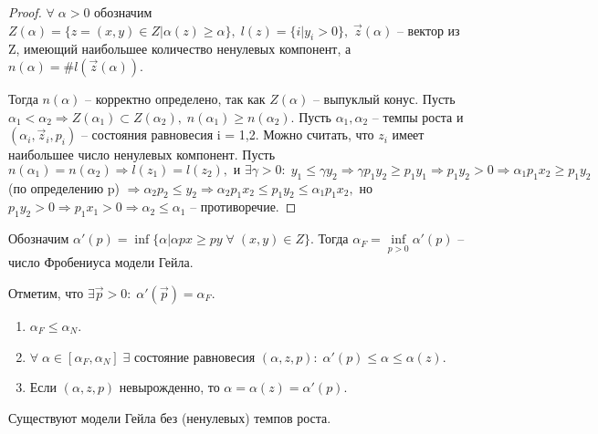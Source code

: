 \begin{proof}
	$\forall \; \alpha > 0$ обозначим $Z(\alpha) = \{ z = (x, y) \in Z | \alpha(z) \geq \alpha\}, \; l(z) = \{ i | y_i > 0\}, \; \vec{z}(\alpha)$ -- вектор из Z, имеющий наибольшее количество ненулевых компонент, а $n(\alpha) = \#l(\vec{z}(\alpha)).$

	Тогда $n(\alpha)$ -- корректно определено, так как $Z(\alpha)$ -- выпуклый конус. Пусть $\alpha_1 < \alpha_2 \Rightarrow Z(\alpha_1) \subset Z(\alpha_2), \; n(\alpha_1) \geq n(\alpha_2).$ Пусть $\alpha_1, \alpha_2$ -- темпы роста и $(\alpha_i, \vec{z}_i, p_i)$ -- состояния равновесия i = 1,2. Можно считать, что $z_i$ имеет наибольшее число ненулевых компонент. Пусть $n(\alpha_1) = n(\alpha_2) \Rightarrow l(z_1) = l(z_2), \text{ и } \exists \gamma > 0: \; y_1 \leq \gamma y_2 \Rightarrow \gamma p_1 y_2 \geq p_1 y_1 \Rightarrow p_1 y_2 > 0 \Rightarrow \alpha_1 p_1 x_2 \geq p_1 y_2$ (по определению p) $\Rightarrow \alpha_2 p_2 \leq y_2  \Rightarrow \alpha_2 p_1 x_2 \leq p_1 y_2 \leq \alpha_1 p_1 x_2, $ но $p_1 y_2 > 0  \Rightarrow p_1 x_1 > 0  \Rightarrow \alpha_2 \leq \alpha_1$ -- противоречие.
\end{proof}

\begin{definition}
	Обозначим $\alpha'(p) = \inf \{ \alpha | \alpha p x  \geq p y \; \forall \; (x, y) \in Z\}.$ Тогда $\alpha_F = \underset{p > 0}{\inf}\alpha'(p)$ -- число Фробениуса модели Гейла.

	Отметим, что $\exists \vec{p} > 0: \; \alpha'(\vec{p}) = \alpha_F.$
\end{definition}

\begin{clair}
	\begin{enumerate}
		\item $\alpha_F \leq \alpha_N$.
		\item $\forall \; \alpha \in [\alpha_F, \alpha_N] \; \exists $ состояние равновесия $(\alpha, z, p): \; \alpha'(p) \leq \alpha \leq \alpha(z)$.
		\item Если $(\alpha, z, p)$ невырожденно, то $\alpha = \alpha(z) = \alpha'(p).$
	\end{enumerate}
\end{clair}

\begin{remark}
	Существуют модели Гейла без (ненулевых) темпов роста.
\end{remark}